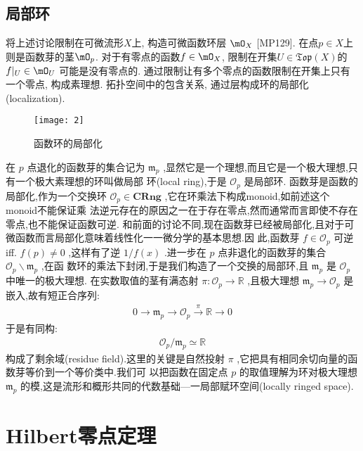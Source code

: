 \subsection{局部环}
将上述讨论限制在可微流形$X$上, 构造可微函数环层 $\mO_X$ [MP129]. 在点$p\in X$上则是函数芽的茎$\mO_p$. 对于有零点的函数$f\in \mO_X$, 限制在开集$U\in \mathfrak{Top}(X)$的 $f|_U \in \mO_U$ 可能是没有零点的. 通过限制让有多个零点的函数限制在开集上只有一个零点, 构成素理想. 拓扑空间中的包含关系, 通过层构成环的局部化 (localization).
\begin{figure}[htbp]
  \centering
  \texttt{[image: 2]}
  \caption{函数环的局部化}
  \label{fig: function ring 3}
\end{figure}
在 $p$ 点退化的函数芽的集合记为 $\mathfrak{m}_p$ ,显然它是一个理想,而且它是一个极大理想,只有一个极大素理想的环叫做局部 环(local ring),于是 $\mathcal{O}_p$ 是局部环.
函数芽是函数的局部化,作为一个交换环 $\mathcal{O}_p \in \mathbf{C R n g}$ ,它在环乘法下构成monoid,如前述这个monoid不能保证乘 法逆元存在的原因之一在于存在零点,然而通常而言即使不存在零点,也不能保证函数可逆.
和前面的讨论不同,现在函数芽已经被局部化,且对于可微函数而言局部化意味着线性化一一微分学的基本思想.因 此,函数芽 $f \in \mathcal{O}_p$ 可逆 iff. $f(p) \neq 0$ ,这样有了逆 $1 / f(x)$ .进一步在 $p$ 点非退化的函数芽的集合 $\mathcal{O}_p \backslash \mathfrak{m}_p$ ,在函 数环的乘法下封闭,于是我们构造了一个交换的局部环,且 $\mathfrak{m}_p$ 是 $\mathcal{O}_p$ 中唯一的极大理想.
在实数取值的茎有满态射 $\pi: \mathcal{O}_p \rightarrow \mathbb{R}$ ,且极大理想 $\mathfrak{m}_p \rightarrow \mathcal{O}_p$ 是嵌入,故有短正合序列:
\begin{align*}
0 \longrightarrow \mathfrak{m}_p \longrightarrow \mathcal{O}_p \stackrel{\pi}{\longrightarrow} \mathbb{R} \longrightarrow 0
\end{align*}
于是有同构:
\begin{align*}
\mathcal{O}_p / \mathfrak{m}_p \simeq \mathbb{R}
\end{align*}
构成了剩余域(residue field).这里的关键是自然投射 $\pi$ ,它把具有相同余切向量的函数芽等价到一个等价类中.我们可 以把函数在固定点 $p$ 的取值理解为环对极大理想 $\mathfrak{m}_p$ 的模,这是流形和概形共同的代数基础—一局部赋环空间(locally ringed space).

\section{Hilbert零点定理}
